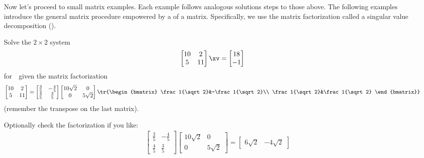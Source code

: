 Now let's proceed to small matrix examples.
Each example follows analogous solutions steps to those above.
The following examples introduce the general matrix procedure empowered by a  of a matrix.
Specifically, we use the matrix factorization called a singular value decomposition (\svd).
\begin{example} \label{eg:2by2svd}
Solve the \(2\times2\) system
\begin{equation*}
\begin{bmatrix} 10&2\\5&11 \end{bmatrix}\xv
=\begin{bmatrix} 18\\-1 \end{bmatrix}
\end{equation*}
for~\xv\ given the matrix factorization
\begin{equation*}
\begin{bmatrix} 10&2\\5&11 \end{bmatrix}=
\begin{bmatrix} \frac35&-\frac45\\\frac45&\frac35 \end{bmatrix}
\begin{bmatrix} 10\sqrt2&0\\0&5\sqrt2 \end{bmatrix}
\tr{\begin{bmatrix} \frac1{\sqrt2}&-\frac1{\sqrt2}\\ \frac1{\sqrt2}&\frac1{\sqrt2} \end{bmatrix}}
\end{equation*}
(remember the transpose on the last matrix).
\begin{solution} 
Optionally check the factorization if you like:
\begin{eqnarray*}&&
\begin{bmatrix} \frac35&-\frac45\\\frac45&\frac35 \end{bmatrix}
\begin{bmatrix} 10\sqrt2&0\\0&5\sqrt2 \end{bmatrix}
=\begin{bmatrix} 6{\sqrt2}& -4{\sqrt2}

\end{bmatrix}
\end{eqnarray*}
\end{solution}
\end{example}
